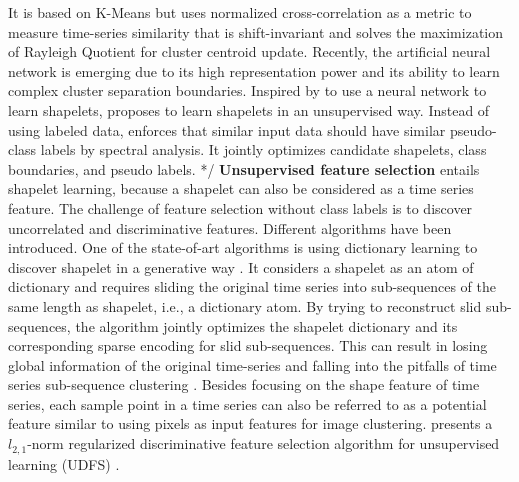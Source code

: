 It is based on K-Means but uses normalized cross-correlation as a metric to measure time-series similarity that is shift-invariant and solves the maximization of Rayleigh Quotient for cluster centroid update. 
Recently, the artificial neural network is emerging due to its high representation power and its ability to learn complex cluster separation boundaries.
Inspired by \cite{Grabocka:2014:LTS:2623330.2623613} to use a neural network to learn shapelets, \cite{Zhang:2016:UFL:3060832.3060946} proposes to learn shapelets in an unsupervised way. Instead of using labeled data, \cite{Zhang:2016:UFL:3060832.3060946} enforces that similar input data should have similar pseudo-class labels by spectral analysis. It jointly optimizes candidate shapelets, class boundaries, and pseudo labels. %
*/
\textbf{Unsupervised feature selection} entails shapelet learning, because a shapelet can also be considered as a time series feature. The challenge of feature selection without class labels is to discover uncorrelated and discriminative features. Different algorithms have been introduced. One of the state-of-art algorithms is using dictionary learning to discover shapelet in a generative way \cite{DBLP:conf/case/ZhangLGWL19}. It considers a shapelet as an atom of dictionary and requires sliding the original time series into sub-sequences of the same length as shapelet, i.e., a dictionary atom. By trying to reconstruct slid sub-sequences, the algorithm jointly optimizes the shapelet dictionary and its corresponding sparse encoding for slid sub-sequences. This can result in losing global information of the original time-series and falling into the pitfalls of time series sub-sequence clustering \cite{Keogh03clusteringof}. Besides focusing on the shape feature of time series, each sample point in a time series can also be referred to as a potential feature similar to using pixels as input features for image clustering. \cite{Yang2011l21R} presents a $l_{2,1}$-norm regularized discriminative feature selection  algorithm for unsupervised learning (UDFS) . 
